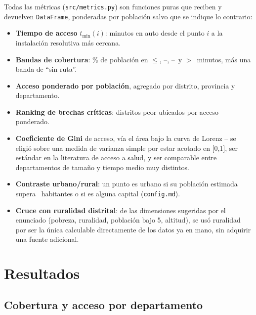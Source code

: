 \documentclass[11pt]{article}
\begin{document}
Todas las métricas (\texttt{src/metrics.py}) son funciones puras que
reciben y devuelven \texttt{DataFrame}, ponderadas por población salvo
que se indique lo contrario:

\begin{itemize}
  \item \textbf{Tiempo de acceso} $t_{\min}(i)$: minutos en auto desde el
  punto $i$ a la instalación resolutiva más cercana.
  \item \textbf{Bandas de cobertura}: \% de población en $\leq$\statCoverageBandFirst,
  \statCoverageBandFirst--\statCoverageBandSecond, \statCoverageBandSecond--\statCoverageBandThird\
  y $>$\statCoverageBandThird\ minutos, más una banda de ``sin ruta''.
  \item \textbf{Acceso ponderado por población}, agregado por distrito,
  provincia y departamento.
  \item \textbf{Ranking de brechas críticas}: distritos peor ubicados por
  acceso ponderado.
  \item \textbf{Coeficiente de Gini} de acceso, vía el área bajo la curva
  de Lorenz -- se eligió sobre una medida de varianza simple por estar
  acotado en [0,1], ser estándar en la literatura de acceso a salud, y ser
  comparable entre departamentos de tamaño y tiempo medio muy distintos.
  \item \textbf{Contraste urbano/rural}: un punto es urbano si su
  población estimada supera \statUrbanPopThreshold\ habitantes o si es
  alguna capital (\texttt{config.md}).
  \item \textbf{Cruce con ruralidad distrital}: de las dimensiones
  sugeridas por el enunciado (pobreza, ruralidad, población bajo 5,
  altitud), se usó ruralidad por ser la única calculable directamente de
  los datos ya en mano, sin adquirir una fuente adicional.
\end{itemize}

\section{Resultados}

\subsection{Cobertura y acceso por departamento}



\end{document}
